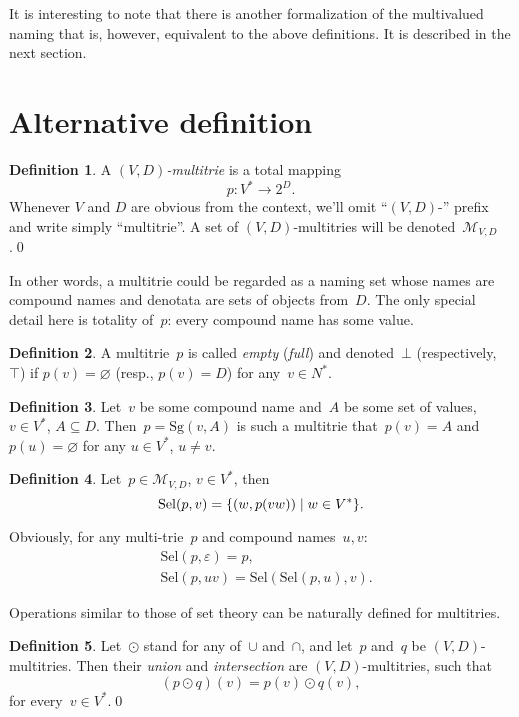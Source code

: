 \documentclass{article}
\theoremstyle{definition}
\newtheorem{Df}{Definition}
\newcommand{\mtempty}{\bot}
\newcommand{\mtfull}{\top}
\newcommand{\setcharmt}{M}
\newcommand{\setsymbol}[3]{\mathcal{#1}_{#2,#3}}
\newcommand{\setmt}[2]{\setsymbol{\setcharmt}{#1}{#2}}
\newcommand{\select}{\mathrm{Sel}}
\newcommand{\singleleaf}{\mathrm{Sg}}
\begin{document}
It is interesting to note that there is another formalization of the
multivalued naming that is, however, equivalent to the above definitions.  It
is described in the next section.

\section{Alternative definition}

\begin{Df}
A \emph{$(V,D)$-multitrie} is a total mapping
\[
  p : V^\ast \to 2^D .
\]
Whenever $V$ and $D$ are obvious from the context, we'll omit ``$(V,D)$-''
prefix and write simply ``multitrie''. A set of $(V,D)$-multitries will be
denoted~$\setmt{V}{D}$.\qed
\end{Df}

In other words, a multitrie could be regarded as a naming set whose names are
compound names and denotata are sets of objects from~$D$. The only special
detail here is totality of~$p$: every compound name has some value.

\begin{Df}
A multitrie~$p$ is called \emph{empty} (\emph{full}) and denoted~$\mtempty$
(respectively,~$\mtfull$) if $p(v)=\varnothing$ (resp., $p(v)=D$) for any~$v\in
N^\ast$.
\end{Df}

\begin{Df}
Let~$v$ be some compound name and~$A$ be some set of values, $v\in V^\ast$,
$A\subseteq D$.  Then~$p = \singleleaf(v,A)$ is such a multitrie that~$p(v) =
A$ and~$p(u) = \varnothing$ for any $u\in V^\ast$, $u\neq v$.
\end{Df}

\begin{Df}\label{df:select}
Let~$p\in\setmt{V}{D}$, $v\in V^\ast$, then
\[
  \select(p,v) = \{ (w, p(vw)) \mid w\in V^\ast \} .\qedhere
\]
\end{Df}

Obviously, for any multi-trie~$p$ and compound names~$u,v$:
\begin{eqnarray*}
  & \select(p,\varepsilon) = p ,\\
  & \select(p,uv) = \select(\select(p,u), v) .
\end{eqnarray*}

Operations similar to those of set theory can be naturally defined for multitries.

\begin{Df}\label{df:union-intersection}
Let~$\odot$ stand for any of~$\cup$ and~$\cap$, and let~$p$ and~$q$ be
$(V,D)$-multitries. Then their \emph{union} and \emph{intersection} are
$(V,D)$-multitries, such that
\[
  (p\odot q)(v) = p(v) \odot q(v) ,
\]
for every~$v\in V^\ast$.\qed
\end{Df}
\end{document}

